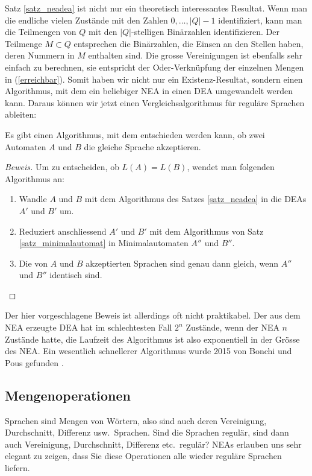 Satz \ref{satz_neadea} ist nicht nur ein theoretisch interessantes
Resultat.
Wenn man die endliche vielen Zustände mit den Zahlen
$0,\dots,|Q|-1$ identifiziert, kann man die Teilmengen von $Q$ mit
den $|Q|$-stelligen Binärzahlen identifizieren.
Der Teilmenge $M\subset Q$ entsprechen die Binärzahlen, die Einsen an
den Stellen haben, deren Nummern in $M$ enthalten sind.
Die grosse Vereinigungen ist ebenfalls sehr einfach
zu berechnen, sie entspricht der Oder-Verknüpfung
der einzelnen Mengen in (\ref{erreichbar}).
Somit haben wir nicht nur ein Existenz-Resultat, sondern einen
Algorithmus, mit dem ein beliebiger NEA in einen DEA umgewandelt
werden kann.
Daraus können wir jetzt einen Vergleichsalgorithmus für reguläre
Sprachen ableiten: 

\begin{satz}
Es gibt einen Algorithmus, mit dem entschieden werden kann, ob
zwei Automaten $A$ und $B$ die gleiche Sprache akzeptieren.
\end{satz}

\begin{proof}[Beweis]
Um zu entscheiden, ob $L(A)=L(B)$, wendet man folgenden Algorithmus
an:
\begin{enumerate}
\item Wandle $A$ und $B$
mit dem Algorithmus des Satzes 
\ref{satz_neadea} in die DEAs $A'$ und $B'$ um.
\item Reduziert anschliessend $A'$ und $B'$  mit dem Algorithmus
von Satz \ref{satz_minimalautomat} in Minimalautomaten
$A''$ und $B''$.
\item Die von $A$ und $B$ akzeptierten Sprachen sind genau dann
gleich, wenn $A''$ und $B''$ identisch sind.
\end{enumerate}
\end{proof}

Der hier vorgeschlagene Beweis ist allerdings oft nicht praktikabel.
Der aus dem NEA erzeugte DEA hat im schlechtesten Fall $2^n$
Zustände, wenn der NEA $n$ Zustände hatte, die Laufzeit des
Algorithmus ist also exponentiell in der Grösse des NEA.
Ein wesentlich schnellerer Algorithmus wurde 2015 von Bonchi und Pous
gefunden \cite{skript:bonchi-pous}.

\subsection{Mengenoperationen\label{regulaer:mengenoperationen}}
%
%
%
%
Sprachen sind Mengen von Wörtern, also sind auch deren Vereinigung,
Durchschnitt, Differenz usw.~Sprachen.
Sind die Sprachen regulär,
sind dann auch Vereinigung, Durchschnitt, Differenz etc.~regulär? 
NEAs erlauben uns sehr elegant zu zeigen, dass Sie diese Operationen
alle wieder reguläre Sprachen liefern.

